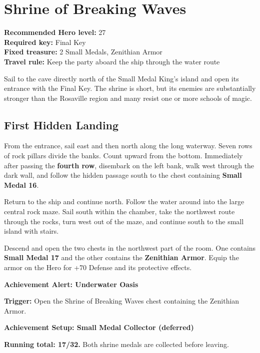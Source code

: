 \documentclass[
  american,
  10pt,
  letterpaper,
  oneside,
  open=any]{scrreprt}
\begin{document}
\section{Shrine of Breaking Waves}\label{shrine-of-breaking-waves}

\textbf{Recommended Hero level:} 27\\
\textbf{Required key:} Final Key\\
\textbf{Fixed treasure:} 2 Small Medals, Zenithian Armor\\
\textbf{Travel rule:} Keep the party aboard the ship through the water
route

Sail to the cave directly north of the Small Medal King's island and
open its entrance with the Final Key. The shrine is short, but its
enemies are substantially stronger than the Rosaville region and many
resist one or more schools of magic.

\subsection{First Hidden Landing}\label{first-hidden-landing}

From the entrance, sail east and then north along the long waterway.
Seven rows of rock pillars divide the banks. Count upward from the
bottom. Immediately after passing the \textbf{fourth row}, disembark on
the left bank, walk west through the dark wall, and follow the hidden
passage south to the chest containing \textbf{Small Medal 16}.

Return to the ship and continue north. Follow the water around into the
large central rock maze. Sail south within the chamber, take the
northwest route through the rocks, turn west out of the maze, and
continue south to the small island with stairs.

Descend and open the two chests in the northwest part of the room. One
contains \textbf{Small Medal 17} and the other contains the
\textbf{Zenithian Armor}. Equip the armor on the Hero for +70 Defense
and its protective effects.

\begin{achievementalert}

\textbf{Achievement Alert: Underwater Oasis}

\textbf{Trigger:} Open the Shrine of Breaking Waves chest containing the
Zenithian Armor.

\end{achievementalert}

\begin{achievementsetup}

\textbf{Achievement Setup: Small Medal Collector (deferred)}

\textbf{Running total: 17/32.} Both shrine medals are collected before
leaving.

\end{achievementsetup}
\end{document}
